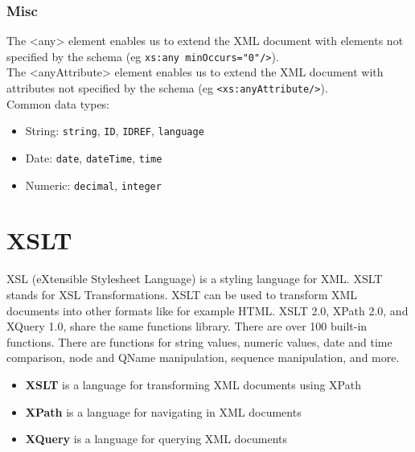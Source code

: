 \documentclass[11pt]{article}
\begin{document}
\subsubsection{Misc}
\label{sec:orgb664dcd}
The <any> element enables us to extend the XML document with elements not specified by the schema (eg \texttt{xs:any minOccurs="0"/>}).\\
The <anyAttribute> element enables us to extend the XML document with attributes not specified by the schema (eg \texttt{<xs:anyAttribute/>}).\\
Common data types:
\begin{itemize}
\item String: \texttt{string}, \texttt{ID}, \texttt{IDREF}, \texttt{language}
\item Date: \texttt{date}, \texttt{dateTime}, \texttt{time}
\item Numeric: \texttt{decimal}, \texttt{integer}
\end{itemize}
\section{XSLT}
\label{sec:org61e3ca0}
XSL (eXtensible Stylesheet Language) is a styling language for XML. XSLT stands for XSL Transformations. XSLT can be used to transform XML documents into other formats like for example HTML. XSLT 2.0, XPath 2.0, and XQuery 1.0, share the same functions library. There are over 100 built-in functions. There are functions for string values, numeric values, date and time comparison, node and QName manipulation, sequence manipulation, and more.
\begin{itemize}
\item \textbf{XSLT} is a language for transforming XML documents using XPath
\item \textbf{XPath} is a language for navigating in XML documents
\item \textbf{XQuery} is a language for querying XML documents
\end{itemize}
\end{document}
